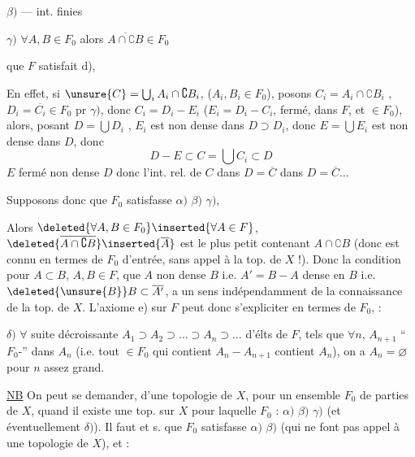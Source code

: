 $\beta)$ — int. finies

$\gamma)$ $\forall A,B\in F_0$ alors $\overline{A\cap\complement B}\in F_0$

  que $F$ satisfait  d), 

En effet, si $\unsure{C}=\bigcup_i A_i\cap\complement B_i$, ($A_i,B_i\in F_0$), posons $C_i=A_i\cap\complement B_i$ , $D_i=\overline{C_i}\in F_0$ pr $\gamma)$, donc $C_i=D_i-E_i$ ($E_i=D_i-C_i$, fermé,  dans $F$, et $\in F_0$), alors, posant $D=\bigcup D_i$ , $E_i$ est   non dense dans $D\supset D_i$, donc $E=\bigcup E_i$ est non dense dans $D$, donc
\[
D-E\subset C=\bigcup C_i\subset D
\]
 $E$ fermé non dense $D$ donc l'int. rel. de $C$ dans $D=\overline C$    dans $D=\overline C\ldots$



Supposons donc que $F_0$ satisfasse $\alpha)$ $\beta)$ $\gamma)$, 

Alors $\deleted{\forall A,B\in F_0}\inserted{\forall A\in F}$, $\deleted{\overline{A\cap\complement B}}\inserted{\overline A}$ est le plus petit  contenant $A\cap\complement B$ (donc est connu en termes de $F_0$ d'entrée, sans appel à la top. de $X$ !). Donc la  condition pour $A\subset B$, $A,B\in F$, que $A$ non dense $B$ i.e. $A'=B-A$ dense en $B$ i.e. $\deleted{\unsure{B}}B\subset\overline{A'}$, a un sens indépendamment de la connaissance de la top. de $X$. L'axiome e) sur $F$ peut donc s'expliciter en termes de $F_0$,  :

$\delta)$ $\forall$ suite décroissante $A_1\supset A_2\supset\ldots\supset A_n\supset\ldots$ d'élts de $F$, tels que $\forall n$, $A_{n+1}$  ``$F_0$-'' dans $A_n$ (i.e.  tout $\in F_0$ qui contient $A_n-A_{n+1}$ contient $A_n$), on a $A_n=\varnothing$ pour $n$ assez grand.

\uline{NB} On peut se demander,  d'une topologie de $X$, pour un ensemble $F_0$ de parties de $X$, quand il existe une top. sur $X$ pour laquelle $F_0$  : $\alpha)$ $\beta)$ $\gamma)$ (et éventuellement $\delta)$). Il faut et s. que $F_0$ satisfasse $\alpha)$ $\beta)$ (qui ne font pas appel à une topologie de $X$), et :


